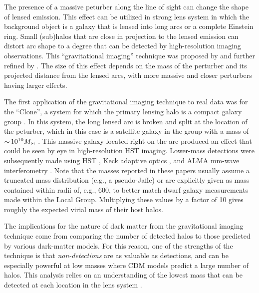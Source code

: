 \vspace{1em} 

The presence of a massive peturber along the line of sight can change the shape of lensed emission. 
This effect can be utilized in strong lens system in which the background object is a galaxy that is lensed into long arcs or a complete Einstein ring.
Small (sub)halos that are close in projection to the lensed emission can distort arc shape to a degree that can be detected by high-resolution imaging observations.
This ``gravitational imaging'' technique was proposed by \cite{Koopmans:aa} and further refined by \citet{Vegetti:2008aa,Vegetti:2009aa}.  The size of this effect depends on the mass of the perturber and its projected distance from the lensed arcs, with more massive and closer perturbers having larger effects.
 
The first application of the gravitational imaging technique to real data was for the ``Clone'', a system for which the primary lensing halo is a compact galaxy group \citep[,][]{Vegetti_2010_1}.
 In this system, the long lensed arc is broken and split at the location of the peturber, which in this case is a satellite galaxy in the group with a mass of $ {\sim}\, 10^{10} M_\odot$ \citep[][]{Vegetti_2010_1}.  This massive galaxy located right on the arc produced an effect that could be seen by eye in high-resolution HST imaging.  Lower-mass detections were subsequently made using HST \citep[$\roughly 10^9 \Msun$;][]{Vegetti_2010_2}, Keck adaptive optics \citep[$\roughly 10^8 \Msun$][]{Vegetti_2012}, and ALMA mm-wave interferometry \citep[$\roughly 10^8 \Msun$][]{Hezaveh_2016ltk}.  
 Note that the masses reported in these papers usually assume a truncated mass distribution (e.g., a pseudo-Jaffe) or are explicitly given as mass contained within radii of, e.g., 600\pc, to better match dwarf galaxy measurements made within the Local Group.  Multiplying these values by a factor of 10 gives roughly the expected virial mass of their host halos.
 
The implications for the nature of dark matter from the gravitational imaging technique come from comparing the number of detected halos to those predicted by various dark-matter models.  
For this reason, one of the strengths of the technique is that {\em non-detections} are as valuable as detections, and can be especially powerful at low masses where CDM models predict a large number of halos.
This analysis relies on an understanding of the lowest mass that can be detected at each location in the lens system \citep[e.g.,][]{Vegetti2014, Hezaveh_2016ltk, Ritondale++18}.
 
